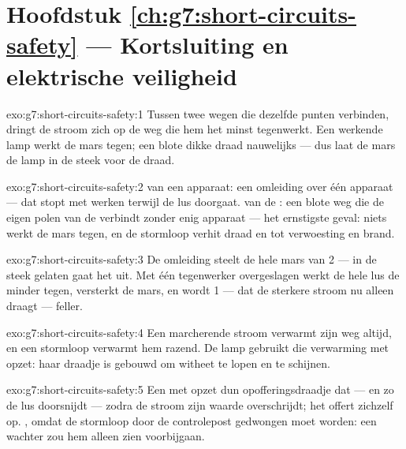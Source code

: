\section*{Hoofdstuk \ref{ch:g7:short-circuits-safety} --- Kortsluiting en elektrische veiligheid}

\begin{solution}{exo:g7:short-circuits-safety:1}
Tussen twee wegen die dezelfde punten verbinden, dringt de stroom zich
op de weg die hem het minst tegenwerkt. Een werkende lamp werkt de
mars tegen; een blote dikke draad nauwelijks --- dus laat de mars de
lamp in de steek voor de draad.
\end{solution}

\begin{solution}{exo:g7:short-circuits-safety:2}
 van een apparaat: een omleiding over één apparaat --- dat
stopt met werken terwijl de lus doorgaat.  van de
: een blote weg die de eigen polen van de
 verbindt zonder enig apparaat --- het ernstigste geval: niets
werkt de mars tegen, en de stormloop verhit draad en
 tot verwoesting en brand.
\end{solution}

\begin{solution}{exo:g7:short-circuits-safety:3}
De omleiding steelt de hele mars van  2 --- in de steek
gelaten gaat het uit. Met één tegenwerker overgeslagen werkt de hele
lus de  minder tegen, versterkt de mars, en wordt
 1 --- dat de sterkere stroom nu alleen draagt --- feller.
\end{solution}

\begin{solution}{exo:g7:short-circuits-safety:4}
Een marcherende stroom verwarmt zijn weg altijd, en een stormloop
verwarmt hem razend. De lamp gebruikt die verwarming met opzet: haar
draadje is gebouwd om witheet te lopen en te schijnen.
\end{solution}

\begin{solution}{exo:g7:short-circuits-safety:5}
Een met opzet dun opofferingsdraadje dat  --- en zo de lus
doorsnijdt --- zodra de stroom zijn waarde overschrijdt; het offert
zichzelf op. , omdat de stormloop door de controlepost
gedwongen moet worden: een wachter  zou hem alleen zien
voorbijgaan.
\end{solution}

